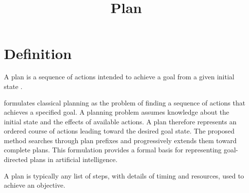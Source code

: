 \documentclass[a4paper]{article}
\title{Plan}
\date{}
\begin{document}
   \maketitle
   \section{Definition}
      A plan is a sequence of actions intended to achieve a goal from a given
      initial state \cite{mcdermott-1999-using-regression-match-graphs-to-control-search-in-planning}.
      
      \cite{mcdermott-1999-using-regression-match-graphs-to-control-search-in-planning} formulates classical planning as the problem of finding a sequence of actions that achieves a specified goal. A planning problem assumes knowledge about the initial state and the effects of available actions. A plan therefore represents an ordered course of actions leading toward the desired goal state. The proposed method searches through plan prefixes and progressively extends them toward complete plans. This formulation provides a formal basis for representing goal-directed plans in artificial intelligence.

      A plan is typically any list of steps, with details of timing and resources, used to achieve an objective. 
\end{document}
